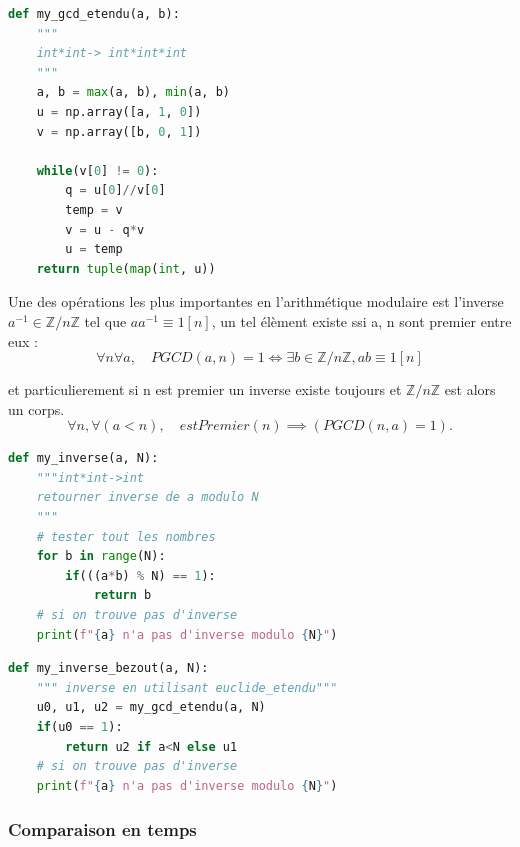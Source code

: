 \documentclass{article}
\begin{document}
\begin{lstlisting}[language=Python, caption=Implémentation de l'algorithme d'Euclide étendu.]
def my_gcd_etendu(a, b):
    """
    int*int-> int*int*int
    """
    a, b = max(a, b), min(a, b)
    u = np.array([a, 1, 0])
    v = np.array([b, 0, 1])

    while(v[0] != 0):
        q = u[0]//v[0]
        temp = v
        v = u - q*v
        u = temp
    return tuple(map(int, u))
\end{lstlisting}

Une des opérations les plus importantes en l'arithmétique modulaire est l'inverse $a^{-1} \in \mathbb{Z}/n\mathbb{Z}$ tel que  $aa^{-1} \equiv 1[n]$, un tel élèment existe ssi a, n sont premier entre eux :
\begin{equation}
    \forall n \forall a, \quad PGCD(a, n)=1 \iff \exists b \in \mathbb{Z}/n\mathbb{Z}, ab \equiv 1[n]
\end{equation}

et particulierement si n est premier un inverse existe toujours et $\mathbb{Z}/n\mathbb{Z}$ est alors un corps.
\begin{equation}
    \forall n, \forall (a<n), \quad \mathit{estPremier}(n) \implies (\mathit{PGCD}(n, a)=1).  
\end{equation}

\begin{lstlisting}[language=Python, caption=Implementation de l'inverse modulaire]
def my_inverse(a, N):
    """int*int->int
    retourner inverse de a modulo N
    """
    # tester tout les nombres
    for b in range(N):
        if(((a*b) % N) == 1):
            return b
    # si on trouve pas d'inverse
    print(f"{a} n'a pas d'inverse modulo {N}")
\end{lstlisting}

\begin{lstlisting}[language=Python, caption=Implementation de l'inverse modulaire Bézout]
def my_inverse_bezout(a, N):
    """ inverse en utilisant euclide_etendu"""
    u0, u1, u2 = my_gcd_etendu(a, N)
    if(u0 == 1):
        return u2 if a<N else u1
    # si on trouve pas d'inverse
    print(f"{a} n'a pas d'inverse modulo {N}")
\end{lstlisting}


\subsubsection{Comparaison en temps}
\end{document}
